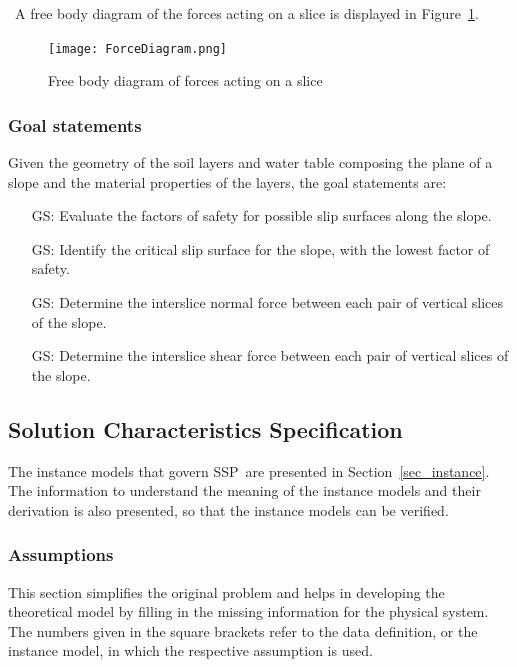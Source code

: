 \documentclass[12pt]{article}
\newcommand{\progname}{SSP}
\newcounter{goalnum} %
\begin{document}
~\newline\noindent A free body diagram of the forces acting on a
slice is displayed in Figure~\ref{Fig_Forces}.

\begin{figure}[h!]
\begin{center}
{
 \texttt{[image: ForceDiagram.png]}
}
\caption{Free body diagram of forces acting on a slice}
\label{Fig_Forces}
\end{center}
\end{figure}

\subsubsection{Goal statements}

Given the geometry of the soil layers and water table composing the plane of a 
slope and the material properties of the layers, the goal statements are:

\begin{itemize}
\item [GS\refstepcounter{goalnum}\thegoalnum: \label{G_FS}]
  {Evaluate the factors of safety for possible slip surfaces along the slope.}
  
\item [GS\refstepcounter{goalnum}\thegoalnum: \label{G_Critical}]
  {Identify the critical slip surface for the slope, with the lowest factor of 
  safety.}

\item [GS\refstepcounter{goalnum}\thegoalnum: \label{G_Normal}]
  {Determine the interslice normal force between each pair of vertical slices   
  of the slope.}
  
\item [GS\refstepcounter{goalnum}\thegoalnum: \label{G_Shear}]
  {Determine the interslice shear force between each pair of vertical slices of 
  the slope.} 
\end{itemize}

\subsection{Solution Characteristics Specification}

The instance models that govern \progname\ are presented in
Section~\ref{sec_instance}.  The information to understand the
meaning of the instance models and their derivation is also presented,
so that the instance models can be verified.

\subsubsection{Assumptions}
\label{Assumptions}
This section simplifies the original problem and helps in developing
the theoretical model by filling in the missing information for the
physical system.
The numbers given in the square brackets refer to the data definition, or the 
instance model, in which the respective
 assumption is used.
\end{document}
